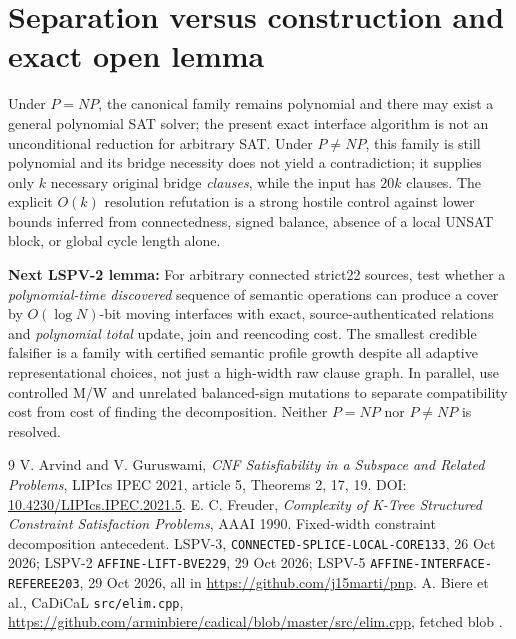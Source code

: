 \documentclass[10pt]{article}
\begin{document}
\section{Separation versus construction and exact open lemma}
Under $P=NP$, the canonical family remains polynomial and there may exist a general polynomial SAT solver; the present exact interface algorithm is not an unconditional reduction for arbitrary SAT. Under $P\ne NP$, this family is still polynomial and its bridge necessity does not yield a contradiction; it supplies only $k$ necessary original bridge \emph{clauses}, while the input has $20k$ clauses. The explicit $O(k)$ resolution refutation is a strong hostile control against lower bounds inferred from connectedness, signed balance, absence of a local UNSAT block, or global cycle length alone.

\textbf{Next LSPV-2 lemma:} For arbitrary connected strict22 sources, test whether a \emph{polynomial-time discovered} sequence of semantic operations can produce a cover by $O(\log N)$-bit moving interfaces with exact, source-authenticated relations and \emph{polynomial total} update, join and reencoding cost. The smallest credible falsifier is a family with certified semantic profile growth despite all adaptive representational choices, not just a high-width raw clause graph. In parallel, use controlled M/W and unrelated balanced-sign mutations to separate compatibility cost from cost of finding the decomposition. Neither $P=NP$ nor $P\ne NP$ is resolved.

\begin{thebibliography}{9}
 V. Arvind and V. Guruswami, \emph{CNF Satisfiability in a Subspace and Related Problems}, LIPIcs IPEC 2021, article 5, Theorems 2, 17, 19. DOI: \href{https://doi.org/10.4230/LIPIcs.IPEC.2021.5}{10.4230/LIPIcs.IPEC.2021.5}.
 E. C. Freuder, \emph{Complexity of K-Tree Structured Constraint Satisfaction Problems}, AAAI 1990. Fixed-width constraint decomposition antecedent.
 LSPV-3, \texttt{CONNECTED-SPLICE-LOCAL-CORE133}, 26 Oct 2026; LSPV-2 \texttt{AFFINE-LIFT-BVE229}, 29 Oct 2026; LSPV-5 \texttt{AFFINE-INTERFACE-REFEREE203}, 29 Oct 2026, all in \url{https://github.com/j15marti/pnp}.
 A. Biere et al., CaDiCaL \texttt{src/elim.cpp}, \url{https://github.com/arminbiere/cadical/blob/master/src/elim.cpp}, fetched blob \texttt{}.
\end{thebibliography}
\end{document}
